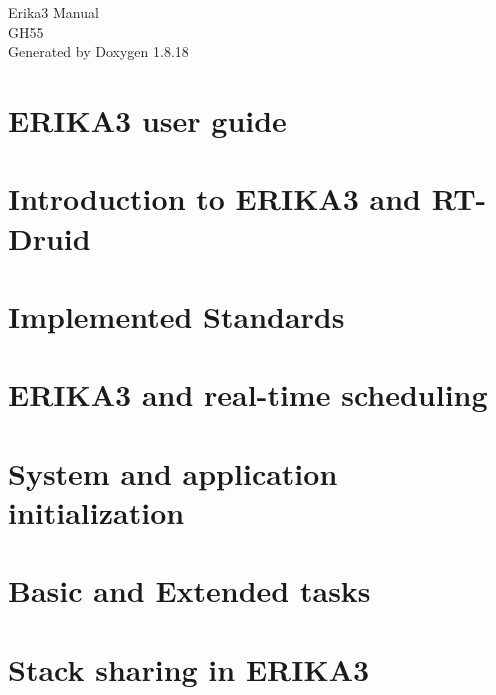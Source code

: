 \let\mypdfximage\pdfximage\def\pdfximage{\immediate\mypdfximage}\documentclass[twoside]{book}
\newcommand{\+}{\discretionary{\mbox{\scriptsize$\hookleftarrow$}}{}{}}
\newcommand{\clearemptydoublepage}{%
  \newpage{\pagestyle{empty}\cleardoublepage}%
}
\begin{document}
\hypersetup{pageanchor=false,
             bookmarksnumbered=true,
             pdfencoding=unicode
            }
\begin{titlepage}
\vspace*{7cm}
\begin{center}%
{\Large Erika3 Manual \\[1ex]\large G\+H55 }\\
\vspace*{1cm}
{\large Generated by Doxygen 1.8.18}\\
\end{center}
\end{titlepage}
\clearemptydoublepage
{}
\tableofcontents
\clearemptydoublepage
{}
\hypersetup{pageanchor=true}

\chapter{E\+R\+I\+K\+A3 user guide}
\label{index}\hypertarget{index}{}
\chapter{Introduction to E\+R\+I\+K\+A3 and R\+T-\/\+Druid}
\label{intro}

\chapter{Implemented Standards}
\label{implemented-standards}

\chapter{E\+R\+I\+K\+A3 and real-\/time scheduling}
\label{scheduler}

\chapter{System and application initialization}
\label{system-init}

\chapter{Basic and Extended tasks}
\label{task-types}

\chapter{Stack sharing in E\+R\+I\+K\+A3}
\label{stack-sharing}

\end{document}
